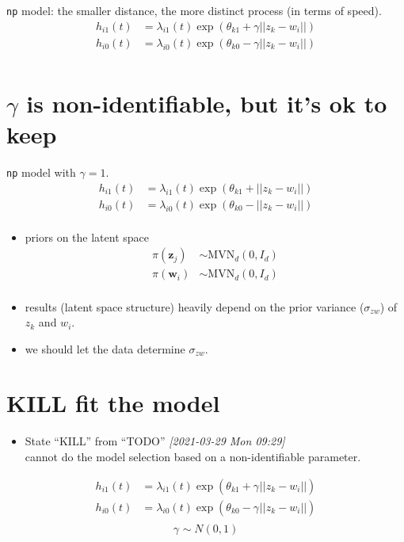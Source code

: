 \documentclass[letterpaper,11pt]{article}
\begin{document}
\texttt{np} model: the smaller distance, the more distinct process (in terms of speed).
\begin{align*}
h_{i1}(t) &= \lambda_{i1}(t) \exp(\theta_{k1} + \gamma ||z_{k} - w_{i}||) \\
h_{i0}(t) &= \lambda_{i0}(t) \exp(\theta_{k0} - \gamma ||z_{k} - w_{i}||) \\
\end{align*}

\section*{\(\gamma\) is non-identifiable, but it's ok to keep}
\label{sec:org918211b}
\texttt{np} model with \(\gamma = 1\).
\begin{align*}
h_{i1}(t) &= \lambda_{i1}(t) \exp(\theta_{k1} + ||z_{k} - w_{i}||) \\
h_{i0}(t) &= \lambda_{i0}(t) \exp(\theta_{k0} - ||z_{k} - w_{i}||) \\
\end{align*}
\begin{itemize}
\item priors on the latent space
\begin{align*}
\pi\left(\mathbf{z}_{j}\right) & \sim \mathrm{MVN}_{d}\left(0, I_{d}\right) \\
\pi\left(\mathbf{w}_{i}\right) & \sim \mathrm{MVN}_{d}\left(0, I_{d}\right) \\
\end{align*}
\item results (latent space structure) heavily depend on the prior variance (\(\sigma_{zw}\)) of \(z_{k}\) and \(w_{i}\).
\item we should let the data determine \(\sigma_{zw}\).
\end{itemize}

\section*{{\bfseries\sffamily KILL} fit the model}
\label{sec:orga265a6f}
\begin{itemize}
\item State ``KILL''       from ``TODO''       \textit{[2021-03-29 Mon 09:29] } \\
cannot do the model selection based on a non-identifiable parameter.
\end{itemize}
\begin{align*}
h_{i1}(t) &= \lambda_{i1}(t) \exp(\theta_{k1} + \gamma_{} ||z_{k} - w_{i}||) \\
h_{i0}(t) &= \lambda_{i0}(t) \exp(\theta_{k0} - \gamma_{} ||z_{k} - w_{i}||) \\
\end{align*}
\[
\gamma_{} \sim N(0,1)
\]
\end{document}
